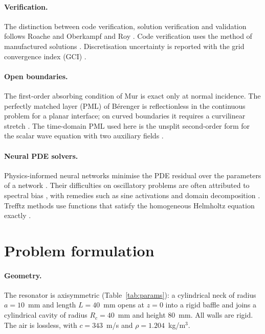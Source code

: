 \documentclass[11pt,a4paper]{article}
\begin{document}
\paragraph{Verification.}
The distinction between code verification, solution verification and validation follows
Roache \citep{roache1998} and Oberkampf and Roy \citep{oberkampf2010}. Code verification uses
the method of manufactured solutions \citep{roache2002}. Discretisation uncertainty is
reported with the grid convergence index (GCI) \citep{roache1994,celik2008}.

\paragraph{Open boundaries.}
The first-order absorbing condition of Mur \citep{mur1981} is exact only at normal
incidence. The perfectly matched layer (PML) of B\'erenger \citep{berenger1994} is
reflectionless in the continuous problem for a planar interface; on curved boundaries it
requires a curvilinear stretch \citep{collino1998}. The time-domain PML used here is the
unsplit second-order form for the scalar wave equation with two auxiliary fields
\citep{grote2010}.

\paragraph{Neural PDE solvers.}
Physics-informed neural networks minimise the PDE residual over the parameters of a
network \citep{raissi2019}. Their difficulties on oscillatory problems are often attributed
to spectral bias \citep{rahaman2019,wang2021}, with remedies such as sine activations
\citep{sitzmann2020} and domain decomposition \citep{moseley2023}. Trefftz methods use
functions that satisfy the homogeneous Helmholtz equation exactly \citep{hiptmair2016}.

\section{Problem formulation}
\label{sec:model}

\paragraph{Geometry.} The resonator is axisymmetric (Table~\ref{tab:params}): a cylindrical
neck of radius $a=10$~mm and length $L=40$~mm opens at $z=0$ into a rigid baffle and joins a
cylindrical cavity of radius $R_c=40$~mm and height 80~mm. All walls are rigid. The air is
lossless, with $c=343$~m/s and $\rho=1.204$~kg/m$^3$.
\end{document}
